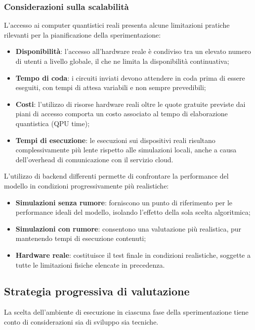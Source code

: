 \subsubsection{Considerazioni sulla scalabilità}
L'accesso ai computer quantistici reali presenta alcune limitazioni pratiche rilevanti per la pianificazione della sperimentazione:
\begin{itemize}
    \item \textbf{Disponibilità}: l'accesso all'hardware reale è condiviso tra un elevato numero di utenti a livello globale, il che ne limita la disponibilità continuativa;
    \item \textbf{Tempo di coda}: i circuiti inviati devono attendere in coda prima di essere eseguiti, con tempi di attesa variabili e non sempre prevedibili;
    \item \textbf{Costi}: l'utilizzo di risorse hardware reali oltre le quote gratuite previste dai piani di accesso comporta un costo associato al tempo di elaborazione quantistica (QPU time);
    \item \textbf{Tempi di esecuzione}: le esecuzioni sui dispositivi reali risultano complessivamente più lente rispetto alle simulazioni locali, anche a causa dell'overhead di comunicazione con il servizio cloud.
\end{itemize}

L'utilizzo di backend differenti permette di confrontare la performance del modello in condizioni progressivamente più realistiche:
\begin{itemize}
    \item \textbf{Simulazioni senza rumore}: forniscono un punto di riferimento per le performance ideali del modello, isolando l'effetto della sola scelta algoritmica;
    \item \textbf{Simulazioni con rumore}: consentono una valutazione più realistica, pur mantenendo tempi di esecuzione contenuti;
    \item \textbf{Hardware reale}: costituisce il test finale in condizioni realistiche, soggette a tutte le limitazioni fisiche elencate in precedenza.
\end{itemize}

\subsection{Strategia progressiva di valutazione}
\label{sec:strategia_valutazione}

La scelta dell'ambiente di esecuzione in ciascuna fase della sperimentazione tiene conto di considerazioni sia di sviluppo sia tecniche.

